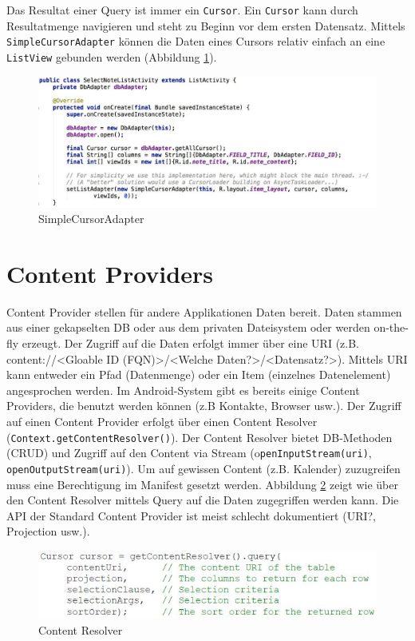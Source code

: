 Das Resultat einer Query ist immer ein \texttt{Cursor}. Ein \texttt{Cursor} kann durch Resultatmenge navigieren und steht zu Beginn vor dem ersten Datensatz. Mittels \texttt{SimpleCursorAdapter} können die Daten eines Cursors relativ einfach an eine \texttt{ListView} gebunden werden (Abbildung \ref{fig:simple-cursor-adapter}).
\begin{figure}
\centering
\includegraphics[width=\linewidth]{fig/simple-cursor-adapter}
\caption{SimpleCursorAdapter}
\label{fig:simple-cursor-adapter}
\end{figure}

\section{Content Providers}

Content Provider stellen für andere Applikationen Daten bereit. Daten stammen aus einer gekapselten DB oder aus dem privaten Dateisystem oder werden on-the-fly erzeugt. Der Zugriff auf die Daten erfolgt immer über eine URI (z.B. content://<Gloable ID (FQN)>/<Welche Daten?>/<Datensatz?>). Mittels URI kann entweder ein Pfad (Datenmenge) oder ein Item (einzelnes Datenelement) angesprochen werden. Im Android-System gibt es bereits einige Content Providers, die benutzt werden können (z.B Kontakte, Browser usw.). Der Zugriff auf einen Content Provider erfolgt über einen Content Resolver (\texttt{Context.getContentResolver()}). Der Content Resolver bietet DB-Methoden (CRUD) und Zugriff auf den Content via Stream (o\texttt{penInputStream(uri)}, \texttt{openOutputStream(uri)}). Um auf gewissen Content (z.B. Kalender) zuzugreifen muss eine Berechtigung im Manifest gesetzt werden. Abbildung \ref{fig:content-resolver} zeigt wie über den Content Resolver mittels Query auf die Daten zugegriffen werden kann. Die API der Standard Content Provider ist meist schlecht dokumentiert (URI?, Projection usw.). 

\begin{figure}
\centering
\includegraphics[width=\linewidth]{fig/content-resolver}
\caption{Content Resolver}
\label{fig:content-resolver}
\end{figure}

